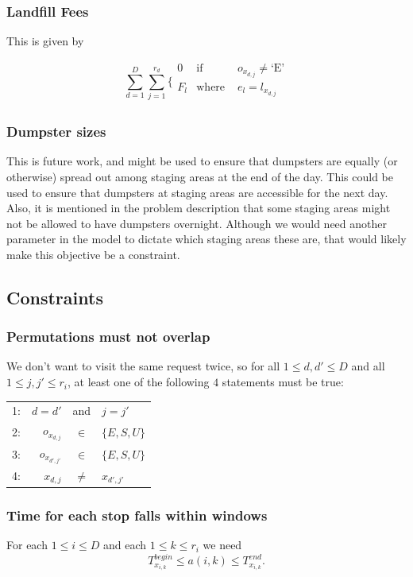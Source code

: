\documentclass{article}
\begin{document}
\subsubsection{Landfill Fees}
This is given by

\[
\sum_{d=1}^D \sum_{j=1}^{r_d }
\{ \begin{array}{ccc}
 0 & \mbox {if } & o_{x_{d,j}}  \ne \mbox{`E'} \\
 F_l & \mbox{where } & e_l = l_{x_{d,j}} \\
\end{array}
\]


\subsubsection{Dumpster sizes}
This is future work, and might be used to ensure that dumpsters are equally (or otherwise) spread out among staging areas at the end of the day.
This could be used to ensure that dumpsters at staging areas are accessible for the next day.
Also, it is mentioned in the problem description that some staging areas might not be allowed to have dumpsters overnight.
Although we would need another parameter in the model to dictate which staging areas these are, that would likely make this objective be a constraint.

\subsection {Constraints}

\subsubsection{Permutations must not overlap}
We don't want to visit the same request twice, so for all $1 \le d, d' \le D$ and all $1 \le j, j' \le r_i$, at least one of the following $4$ statements must be true:

\begin{tabular}{ l r  c  l }
1: & $ d=d'$ & and & $j = j'$ \\
2: & $ o_{x_{d,j}}$ & $\in$ & $\{E, S, U\}$ \\
3: & $ o_{x_{d',j'}}$ & $\in$ & $\{E, S, U\}$ \\
4: & $x_{d,j}$ & $\ne$ & $x_{d', j'}$ \\
\end{tabular}

\subsubsection{Time for each stop falls within windows}
For each $1 \le i \le D$ and each $1 \le k \le r_i$ we need
$$ T^{begin}_{x_{i,k}} \le a(i, k) \le  T^{end}_{x_{i,k}}.$$
\end{document}
